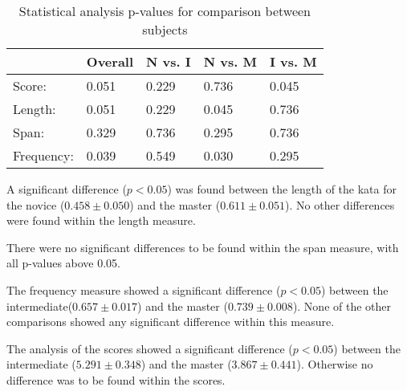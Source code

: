 \begin{table}[h]
	\begin{tabular}{|l|l|l|l|l|}
		\hline
		& Overall & N vs. I & N vs. M & I vs. M \\ \hline
		Score:     & 0.051   & 0.229   & 0.736   & 0.045   \\ \hline
		Length:    & 0.051   & 0.229   & 0.045   & 0.736   \\ \hline
		Span:      & 0.329   & 0.736   & 0.295   & 0.736   \\ \hline
		Frequency: & 0.039   & 0.549   & 0.030   & 0.295   \\ \hline
	\end{tabular}
	\caption{Statistical analysis p-values for comparison between subjects}
	\label{tab:pValues}
\end{table}

A significant difference ($p<0.05$) was found between the length of the kata for the novice ($0.458\pm0.050$) and the master ($0.611\pm0.051$). No other differences were found within the length measure.

There were no significant differences to be found within the span measure, with all p-values above 0.05.

The frequency measure showed a significant difference ($p<0.05$) between the intermediate($0.657\pm0.017$) and the master ($0.739\pm0.008$). None of the other comparisons showed any significant difference within this measure.

The analysis of the scores showed a significant difference ($p<0.05$) between the intermediate ($5.291\pm0.348$) and the master ($3.867\pm0.441$). Otherwise no difference was to be found within the scores.